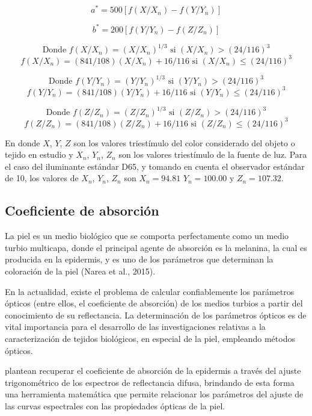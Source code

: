 		\begin{equation}\label{eq:a}
			a^* = 500[f(X/X_n) - f(Y/Y_n)]
		\end{equation}
		
		\begin{equation}\label{eq:b}
			b^* = 200[f(Y/Y_n) - f(Z/Z_n)]
		\end{equation}
		
		$$\text{Donde } f(X/X_n) = (X/X_n)^{1/3} \text{ si } (X/X_n) > (24/116)^3$$
		$$f(X/X_n) = (841/108)(X/X_n) + 16/116 \text{ si } (X/X_n) \leq (24/116)^3$$
		
		$$\text{Donde } f(Y/Y_n) = (Y/Y_n)^{1/3} \text{ si } (Y/Y_n) > (24/116)^3$$
		$$f(Y/Y_n) = (841/108)(Y/Y_n) + 16/116 \text{ si } (Y/Y_n) \leq (24/116)^3$$
		
		$$\text{Donde } f(Z/Z_n) = (Z/Z_n)^{1/3} \text{ si } (Z/Z_n) > (24/116)^3$$
		$$f(Z/Z_n) = (841/108)(Z/Z_n) + 16/116 \text{ si } (Z/Z_n) \leq (24/116)^3$$
		
		En donde $X$, $Y$, $Z$ son los valores triest\'{i}mulo del color considerado del objeto o tejido en estudio y $X_n$, $Y_n$, $Z_n$ son los valores triest\'{i}mulo de la fuente de luz. Para el caso del iluminante est\'{a}ndar D65, y tomando en cuenta el observador est\'{a}ndar de 10\degree, los valores de $X_n$, $Y_n$, $Z_n$ son $X_n = 94.81$ $Y_n = 100.00$ y $Z_n = 107.32$.

	\subsection{Coeficiente de absorci\'{o}n}
	
		La piel es un medio biol\'{o}gico que se comporta perfectamente como un medio turbio multicapa, donde el principal agente de absorci\'{o}n es la melanina, la cual es producida en la epidermis, y es uno de los par\'{a}metros que determinan la coloraci\'{o}n de la piel (Narea et al., 2015).
		
		En la actualidad, existe el problema de calcular confiablemente los par\'{a}metros \'{o}pticos (entre ellos, el coeficiente de absorci\'{o}n) de los medios turbios a partir del conocimiento de su reflectancia. La determinaci\'{o}n de los par\'{a}metros \'{o}pticos es de vital importancia para el desarrollo de las investigaciones relativas a la caracterizaci\'{o}n de tejidos biol\'{o}gicos, en especial de la piel, empleando m\'{e}todos \'{o}pticos.
		
		\cite{Narea} plantean recuperar el coeficiente de absorci\'{o}n de la epidermis a trav\'{e}s del ajuste trigonom\'{e}trico de los espectros de reflectancia difusa, brindando de esta forma una herramienta matem\'{a}tica que permite relacionar los par\'{a}metros del ajuste de las curvas espectrales con las propiedades \'{o}pticas de la piel.
		
